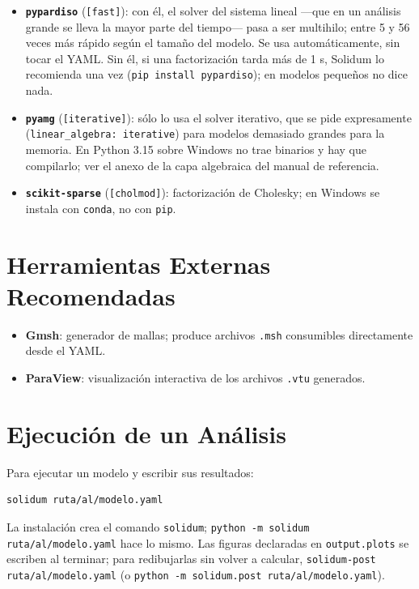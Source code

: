 \documentclass[11pt,oneside]{report}
\begin{document}
\begin{itemize}
  \item \textbf{\texttt{pypardiso}} (\texttt{[fast]}): con él, el solver del sistema lineal ---que en un análisis grande se lleva la mayor parte del tiempo--- pasa a ser multihilo; entre 5 y 56 veces más rápido según el tamaño del modelo. Se usa automáticamente, sin tocar el YAML. Sin él, si una factorización tarda más de 1 s, Solidum lo recomienda una vez (\texttt{pip install pypardiso}); en modelos pequeños no dice nada.
  \item \textbf{\texttt{pyamg}} (\texttt{[iterative]}): sólo lo usa el solver iterativo, que se pide expresamente (\texttt{linear\_\allowbreak{}algebra: iterative}) para modelos demasiado grandes para la memoria. En Python 3.15 sobre Windows no trae binarios y hay que compilarlo; ver el anexo de la capa algebraica del manual de referencia.
  \item \textbf{\texttt{scikit-sparse}} (\texttt{[cholmod]}): factorización de Cholesky; en Windows se instala con \texttt{conda}, no con \texttt{pip}.
\end{itemize}

\section{Herramientas Externas Recomendadas}

\begin{itemize}
  \item \textbf{Gmsh}: generador de mallas; produce archivos \texttt{.msh} consumibles directamente desde el YAML.
  \item \textbf{ParaView}: visualización interactiva de los archivos \texttt{.vtu} generados.
\end{itemize}

\section{Ejecución de un Análisis}

Para ejecutar un modelo y escribir sus resultados:

\begin{lstlisting}[language=bash]
solidum ruta/al/modelo.yaml

\end{lstlisting}

La instalación crea el comando \texttt{solidum}; \texttt{python -m solidum ruta/\allowbreak{}al/\allowbreak{}modelo.\allowbreak{}yaml} hace lo mismo. Las figuras declaradas en \texttt{output.plots} se escriben al terminar; para redibujarlas sin volver a calcular, \texttt{solidum-post ruta/\allowbreak{}al/\allowbreak{}modelo.\allowbreak{}yaml} (o \texttt{python -m solidum.\allowbreak{}post ruta/\allowbreak{}al/\allowbreak{}modelo.\allowbreak{}yaml}).
\end{document}

